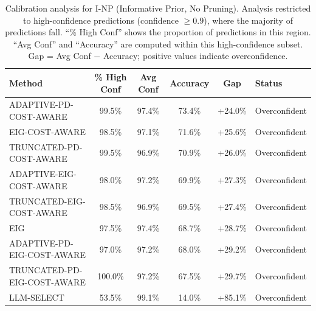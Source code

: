\begin{table}[htbp]
\centering
\small
\caption{Calibration analysis for I-NP (Informative Prior, No Pruning). Analysis restricted to high-confidence predictions (confidence $\geq 0.9$), where the majority of predictions fall. ``\% High Conf'' shows the proportion of predictions in this region. ``Avg Conf'' and ``Accuracy'' are computed within this high-confidence subset. Gap = Avg Conf $-$ Accuracy; positive values indicate overconfidence.}
\label{tab:calibration-notprune_notuniform}
\begin{tabular}{@{}lccccl@{}}
\toprule
Method & \% High Conf & Avg Conf & Accuracy & Gap & Status \\
\midrule
ADAPTIVE-PD-COST-AWARE & 99.5\% & 97.4\% & 73.4\% & +24.0\% & Overconfident \\
EIG-COST-AWARE & 98.5\% & 97.1\% & 71.6\% & +25.6\% & Overconfident \\
TRUNCATED-PD-COST-AWARE & 99.5\% & 96.9\% & 70.9\% & +26.0\% & Overconfident \\
ADAPTIVE-EIG-COST-AWARE & 98.0\% & 97.2\% & 69.9\% & +27.3\% & Overconfident \\
TRUNCATED-EIG-COST-AWARE & 98.5\% & 96.9\% & 69.5\% & +27.4\% & Overconfident \\
EIG & 97.5\% & 97.4\% & 68.7\% & +28.7\% & Overconfident \\
ADAPTIVE-PD-EIG-COST-AWARE & 97.0\% & 97.2\% & 68.0\% & +29.2\% & Overconfident \\
TRUNCATED-PD-EIG-COST-AWARE & 100.0\% & 97.2\% & 67.5\% & +29.7\% & Overconfident \\
LLM-SELECT & 53.5\% & 99.1\% & 14.0\% & +85.1\% & Overconfident \\
\bottomrule
\end{tabular}
\end{table}